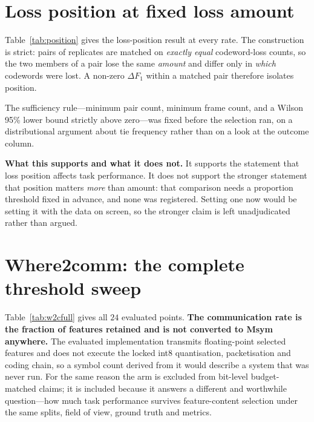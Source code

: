 \documentclass[journal]{IEEEtran}
\begin{document}
\begin{table}[t]
\caption{Complete transport sweep on the development split, all three delivery regimes.
$q$ is the message-level survival probability; the fragment-aware and packet columns are means over
$\TransportReplicates$ realisations.}
\label{tab:transport}
\centering\small\setlength{\tabcolsep}{3pt}

\end{table}

\section{Loss position at fixed loss amount}
Table~\ref{tab:position} gives the loss-position result at every rate. The construction is strict:
pairs of replicates are matched on \emph{exactly equal} codeword-loss counts, so the two members of a
pair lose the same \emph{amount} and differ only in \emph{which} codewords were lost. A non-zero
$\Delta F_1$ within a matched pair therefore isolates position.

The sufficiency rule---minimum pair count, minimum frame count, and a Wilson 95\% lower bound
strictly above zero---was fixed before the selection ran, on a distributional argument about tie
frequency rather than on a look at the outcome column.

\textbf{What this supports and what it does not.} It supports the statement that loss position
affects task performance. It does not support the stronger statement that position matters
\emph{more} than amount: that comparison needs a proportion threshold fixed in advance, and none was
registered. Setting one now would be setting it with the data on screen, so the stronger claim is
left unadjudicated rather than argued.

\begin{table}[t]
\caption{Loss position at exactly equal codeword-loss counts, per rate and pooled.
$\Pr(\Delta F_1 \neq 0)$ is the fraction of matched pairs whose task outcome differs.}
\label{tab:position}
\centering\small\setlength{\tabcolsep}{3pt}

\end{table}

\section{Where2comm: the complete threshold sweep}
Table~\ref{tab:w2cfull} gives all $24$ evaluated points. \textbf{The communication rate is the
fraction of features retained and is not converted to Msym anywhere.} The evaluated implementation
transmits floating-point selected features and does not execute the locked int8 quantisation,
packetisation and coding chain, so a symbol count derived from it would describe a system that was
never run. For the same reason the arm is excluded from bit-level budget-matched claims; it is
included because it answers a different and worthwhile question---how much task performance survives
feature-content selection under the same splits, field of view, ground truth and metrics.
\end{document}
